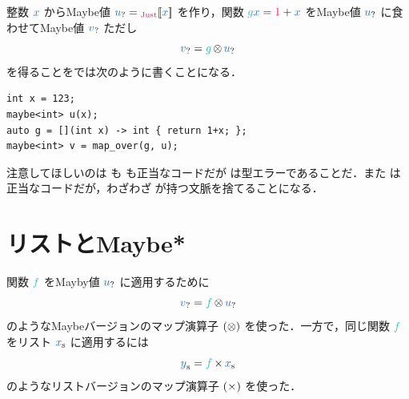\documentclass[a5paper,twoside,fleqn,draft]{jsbook}
\begin{document}
整数 $\hVar{x}$ からMaybe値 $\hMaybeVar{u}=\hJustWith{\hVar{x}}$ を作り，関数 $\hFunc{g}\hVar{x}=\hConstant{1}+\hVar{x}$ をMaybe値 $\hMaybeVar{u}$ に食わせてMaybe値 $\hMaybeVar{v}$ ただし
\begin{equation}
  \hMaybeVar{v}
  =\hFunc{g}\hMaybeMap\hMaybeVar{u}
\end{equation}
を得ることを\cxx では次のように書くことになる．
\begin{cxxcode}
\begin{verbatim}
int x = 123;
maybe<int> u(x);
auto g = [](int x) -> int { return 1+x; };
maybe<int> v = map_over(g, u);
\end{verbatim}
\end{cxxcode}
注意してほしいのは  も  も正当なコードだが  は型エラーであることだ．また  は正当なコードだが，わざわざ  が持つ文脈を捨てることになる．


\section{リストとMaybe*}

関数 $\hFunc{f}$ をMayby値 $\hMaybeVar{u}$ に適用するために
\begin{equation}
  \hMaybeVar{v}
  =\hFunc{f}\hMaybeMap\hMaybeVar{u}
\end{equation}
のようなMaybeバージョンのマップ演算子 $(\operatorname{\otimes})$ を使った．一方で，同じ関数 $\hFunc{f}$ をリスト $\hListVar{x}$ に適用するには
\begin{equation}
  \hListVar{y}
  =\hFunc{f}\hMap\hListVar{x}
\end{equation}
のようなリストバージョンのマップ演算子 $(\operatorname{\times})$ を使った．
\end{document}
